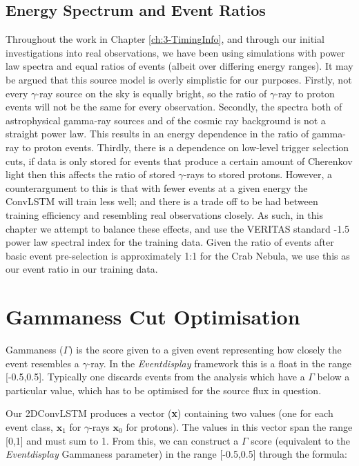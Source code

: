 \subsection{Energy Spectrum and Event Ratios}
Throughout the work in Chapter \ref{ch:3-TimingInfo}, and through our initial investigations into real observations, we have been using simulations with power law spectra and equal ratios of events (albeit over differing energy ranges). It may be argued that this source model is overly simplistic for our purposes. Firstly, not every $\gamma$-ray source on the sky is equally bright, so the ratio of $\gamma$-ray to proton events will not be the same for every observation. Secondly, the spectra both of astrophysical gamma-ray sources and of the cosmic ray background is not a straight power law. This results in an energy dependence in the ratio of gamma-ray to proton events. Thirdly, there is a dependence on low-level trigger selection cuts, if data is only stored for events that produce a certain amount of Cherenkov light then this affects the ratio of stored $\gamma$-rays to stored protons. However, a counterargument to this is that with fewer events at a given energy the ConvLSTM will train less well; and there is a trade off to be had between training efficiency and resembling real observations closely. As such, in this chapter we attempt to balance these effects, and use the VERITAS standard -1.5 power law spectral index for the training data. Given the ratio of events after basic event pre-selection is approximately 1:1 for the Crab Nebula, we use this as our event ratio in our training data.

\section{Gammaness Cut Optimisation}
Gammaness ($\Gamma$) is the score given to a given event representing how closely the event resembles a $\gamma$-ray. In the \textit{Eventdisplay} framework this is a float in the range [-0.5,0.5]. Typically one discards events from the analysis which have a $\Gamma$ below a particular value, which has to be optimised for the source flux in question. 

Our 2DConvLSTM produces a vector (\textbf{x}) containing two values (one for each event class,   $\textbf{x}_1$ for $\gamma$-rays $\textbf{x}_0$ for protons). The values in this vector span the range [0,1] and must sum to 1. From this, we can construct a $\Gamma$ score (equivalent to the \textit{Eventdisplay} Gammaness parameter) in the range [-0.5,0.5] through the formula:

